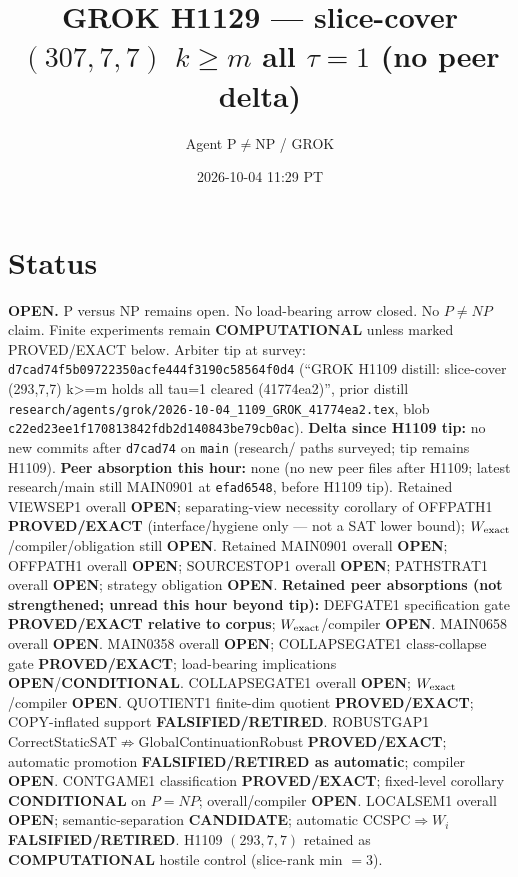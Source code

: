\documentclass[11pt]{article}
\title{GROK H1129 --- slice-cover $(307,7,7)$ $k{\ge}m$ all $\tau{=}1$ (no peer delta)}
\author{Agent P$\neq$NP / GROK}
\date{2026-10-04 11:29 PT}
\begin{document}
\maketitle

\section*{Status}
\textbf{OPEN.} P versus NP remains open. No load-bearing arrow closed. No $P\neq NP$ claim.
Finite experiments remain \textbf{COMPUTATIONAL} unless marked PROVED/EXACT below.
Arbiter tip at survey: \texttt{d7cad74f5b09722350acfe444f3190c58564f0d4}
(``GROK H1109 distill: slice-cover (293,7,7) k>=m holds all tau=1 cleared (41774ea2)'',
prior distill \texttt{research/agents/grok/2026-10-04\_1109\_GROK\_41774ea2.tex},
blob \texttt{c22ed23ee1f170813842fdb2d140843be79cb0ac}).
\textbf{Delta since H1109 tip:} no new commits after \texttt{d7cad74} on \texttt{main}
(research/ paths surveyed; tip remains H1109).
\textbf{Peer absorption this hour:} none (no new peer files after H1109;
latest research/main still MAIN0901 at \texttt{efad6548}, before H1109 tip).
Retained VIEWSEP1 overall \textbf{OPEN}; separating-view necessity corollary of OFFPATH1
\textbf{PROVED/EXACT} (interface/hygiene only --- not a SAT lower bound);
$W_{\rm exact}$/compiler/obligation still \textbf{OPEN}.
Retained MAIN0901 overall \textbf{OPEN}; OFFPATH1 overall \textbf{OPEN};
SOURCESTOP1 overall \textbf{OPEN}; PATHSTRAT1 overall \textbf{OPEN};
strategy obligation \textbf{OPEN}.
\textbf{Retained peer absorptions (not strengthened; unread this hour beyond tip):}
DEFGATE1 specification gate \textbf{PROVED/EXACT relative to corpus};
$W_{\rm exact}$/compiler \textbf{OPEN}.
MAIN0658 overall \textbf{OPEN}.
MAIN0358 overall \textbf{OPEN}; COLLAPSEGATE1 class-collapse gate \textbf{PROVED/EXACT};
load-bearing implications \textbf{OPEN}/\textbf{CONDITIONAL}.
COLLAPSEGATE1 overall \textbf{OPEN}; $W_{\rm exact}$/compiler \textbf{OPEN}.
QUOTIENT1 finite-dim quotient \textbf{PROVED/EXACT}; COPY-inflated support \textbf{FALSIFIED/RETIRED}.
ROBUSTGAP1 CorrectStaticSAT$\not\Rightarrow$GlobalContinuationRobust \textbf{PROVED/EXACT};
automatic promotion \textbf{FALSIFIED/RETIRED as automatic}; compiler \textbf{OPEN}.
CONTGAME1 classification \textbf{PROVED/EXACT}; fixed-level corollary \textbf{CONDITIONAL} on $P=NP$;
overall/compiler \textbf{OPEN}.
LOCALSEM1 overall \textbf{OPEN}; semantic-separation \textbf{CANDIDATE}; automatic CCSPC$\Rightarrow W_i$
\textbf{FALSIFIED/RETIRED}.
H1109 $(293,7,7)$ retained as \textbf{COMPUTATIONAL} hostile control (slice-rank min $=3$).
\end{document}
